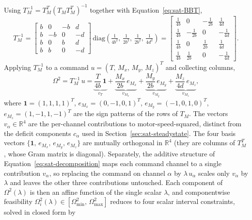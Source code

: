 \documentclass[conf]{new-aiaa}
\begin{document}
Using $T_M^{-1} = T_M^T (T_M T_M^T)^{-1}$ together with Equation~\ref{eq:sat-BBT},
\small
\begin{equation}
\label{eq:sat-TMinv}
T_M^{-1}
= \begin{bmatrix}
b & 0 & -b & d \\
b & -b & 0 & -d \\
b & 0 & b & d \\
b & b & 0 & -d
\end{bmatrix}
\,
\mathrm{diag}\!\left(\tfrac{1}{4 b^2},\, \tfrac{1}{2 b^2},\, \tfrac{1}{2 b^2},\, \tfrac{1}{4 d^2}\right)
= \begin{bmatrix}
\tfrac{1}{4 b} & 0 & -\tfrac{1}{2 b} & \tfrac{1}{4 d} \\[2pt]
\tfrac{1}{4 b} & -\tfrac{1}{2 b} & 0 & -\tfrac{1}{4 d} \\[2pt]
\tfrac{1}{4 b} & 0 & \tfrac{1}{2 b} & \tfrac{1}{4 d} \\[2pt]
\tfrac{1}{4 b} & \tfrac{1}{2 b} & 0 & -\tfrac{1}{4 d}
\end{bmatrix}.
\end{equation}
\normalsize
Applying $T_M^{-1}$ to a command $u = (T,\, M_x,\, M_y,\, M_z)^T$ and collecting columns,
\small
\begin{equation}
\label{eq:sat-decomposition}
\Omega^2 = T_M^{-1}\, u =
\underbrace{\frac{T}{4 b}\, \mathbf{1}}_{v_T}
+ \underbrace{\frac{M_x}{2 b}\, e_{M_x}}_{v_{M_x}}
+ \underbrace{\frac{M_y}{2 b}\, e_{M_y}}_{v_{M_y}}
+ \underbrace{\frac{M_z}{4 d}\, e_{M_z}}_{v_{M_z}},
\end{equation}
\normalsize
where $\mathbf{1} = (1,1,1,1)^T$, $e_{M_x} = (0,-1,0,1)^T$, $e_{M_y} = (-1,0,1,0)^T$, $e_{M_z} = (1,-1,1,-1)^T$ are the sign patterns of the rows of $T_M$. The vectors $v_\alpha \in \mathbb{R}^4$ are the per-channel contributions to motor-speed-squared, distinct from the deficit components $c_\alpha$ used in Section~\ref{sec:sat-steadystate}. The four basis vectors $\{\mathbf{1},\, e_{M_x},\, e_{M_y},\, e_{M_z}\}$ are mutually orthogonal in $\mathbb{R}^4$ (they are columns of $T_M^T$, whose Gram matrix is diagonal). Separately, the additive structure of Equation~\ref{eq:sat-decomposition} maps each command channel to a single contribution $v_\alpha$, so replacing the command on channel $\alpha$ by $\lambda\, u_\alpha$ scales only $v_\alpha$ by $\lambda$ and leaves the other three contributions untouched. Each component of $\Omega^2(\lambda)$ is then an affine function of the single scalar $\lambda$, and componentwise feasibility $\Omega^2_i(\lambda) \in [\Omega^2_{\min},\, \Omega^2_{\max}]$ reduces to four scalar interval constraints, solved in closed form by
\end{document}
